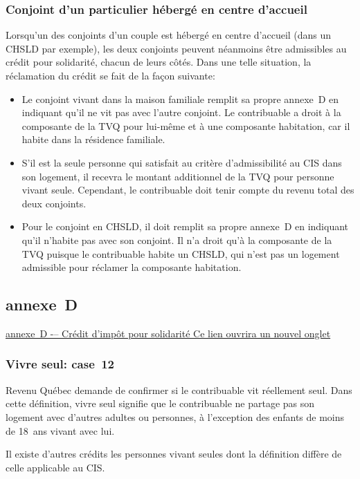 \subsubsection{Conjoint d'un particulier hébergé en centre d'accueil}
Lorsqu'un des conjoints d'un couple est hébergé en centre d'accueil (dans un CHSLD par exemple), les deux conjoints peuvent néanmoins être admissibles au crédit pour solidarité, chacun de leurs côtés. Dans une telle situation, la réclamation du crédit se fait de la façon suivante:
\begin{itemize}
	\item Le conjoint vivant dans la maison familiale remplit sa propre annexe~D en indiquant qu'il ne vit pas avec l'autre conjoint. Le contribuable a droit à la composante de la TVQ pour lui-même et à une composante habitation, car il habite dans la résidence familiale.
	\item S'il est la seule personne qui satisfait au critère d'admissibilité au CIS dans son logement, il recevra le montant additionnel de la TVQ pour personne vivant seule. Cependant, le contribuable doit tenir compte du revenu total des deux conjoints.
	\item Pour le conjoint en CHSLD, il doit remplit sa propre annexe~D en indiquant qu'il n'habite pas avec son conjoint. Il n'a droit qu'à la composante de la TVQ puisque le contribuable habite un CHSLD, qui n'est pas un logement admissible pour réclamer la composante habitation. 
\end{itemize}


\subsection{annexe~D}
\href{https://www.revenuquebec.ca/documents/fr/formulaires/tp/2023-12/TP-1.D.D%282023-12%29.pdf}{annexe~D -– Crédit d'impôt pour solidarité Ce lien ouvrira un nouvel onglet}

\subsubsection{Vivre seul: case~12}
Revenu Québec demande de confirmer si le contribuable vit réellement seul. Dans cette définition, \og vivre seul \fg{} signifie que le contribuable ne partage pas son logement avec d'autres adultes ou personnes, à l'exception des enfants de moins de 18~ans vivant avec lui.

Il existe d'autres crédits les personnes vivant seules dont la définition diffère de celle applicable au CIS.

